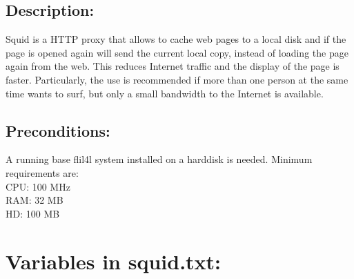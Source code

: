 
\subsection{Description:}
Squid is a HTTP proxy that allows to cache web pages to a local disk and if
the page is opened again will send the current local copy, instead of loading
the page again from the web. This reduces Internet traffic and the display of
the page is faster. Particularly, the use is recommended if more than one person
at the same time wants to surf, but only a small bandwidth to the Internet is
available.

\subsection{Preconditions:}

A running base flil4l system installed on a harddisk is needed.
Minimum requirements are:\\
CPU: 100 MHz\\
RAM:  32 MB\\
HD:  100 MB


\section{Variables in squid.txt:}

